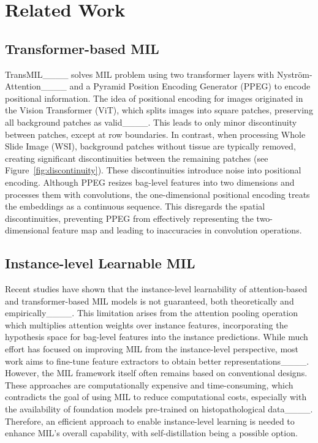 \section{Related Work}
\subsection{Transformer-based MIL}
TransMIL____ solves MIL problem using two transformer layers with Nyström-Attention____ and a Pyramid Position Encoding Generator (PPEG) to encode positional information. The idea of positional encoding for images originated in the Vision Transformer (ViT), which splits images into square patches, preserving all background patches as valid____. This leads to only minor discontinuity between patches, except at row boundaries. In contrast, when processing Whole Slide Image (WSI), background patches without tissue are typically removed, creating significant discontinuities between the remaining patches (see Figure~\ref{fig:discontinuity}). These discontinuities introduce noise into positional encoding. Although PPEG resizes bag-level features into two dimensions and processes them with convolutions, the one-dimensional positional encoding treats the embeddings as a continuous sequence. This disregards the spatial discontinuities, preventing PPEG from effectively representing the two-dimensional feature map and leading to inaccuracies in convolution operations.

\subsection{Instance-level Learnable MIL}
Recent studies have shown that the instance-level learnability of attention-based and transformer-based MIL models is not guaranteed, both theoretically and empirically____. This limitation arises from the attention pooling operation which multiplies attention weights over instance features, incorporating the hypothesis space for bag-level features into the instance predictions. While much effort has focused on improving MIL from the instance-level perspective, most work aims to fine-tune feature extractors to obtain better representations____. However, the MIL framework itself often remains based on conventional designs. These approaches are computationally expensive and time-consuming, which contradicts the goal of using MIL to reduce computational costs, especially with the availability of foundation models pre-trained on histopathological data____. Therefore, an efficient approach to enable instance-level learning is needed to enhance MIL’s overall capability, with self-distillation being a possible option.

